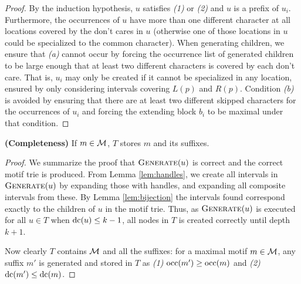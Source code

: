 \begin{proof}
    By the induction hypothesis, $u$ satisfies \emph{(1)} or \emph{(2)} and $u$ is a prefix of $u_i$. Furthermore, the occurrences of $u$ have more than one different character at all locations covered by the don't cares in $u$ (otherwise one of those locations in $u$ could be specialized to the common character).     
    When generating children, we ensure that \emph{(a)} cannot occur by forcing the occurrence list of generated children to be large enough that at least two different characters is covered by each don't care. That is, $u_i$ may only be created if it cannot be specialized in any location, ensured by only considering intervals covering $L(p)$ and $R(p)$. Condition \emph{(b)} is avoided by ensuring that there are at least two different skipped characters for the occurrences of $u_i$ and forcing the extending block $b_i$ to be maximal under that condition. 
\end{proof}

\begin{lemma}\label{lem:completeness}
\textbf{(Completeness)} If $m \in \mathcal{M}$, $T$ stores $m$ and its suffixes.
\end{lemma}
\begin{proof}
    We summarize the proof that $\operatorname{\textsc{Generate}}(u)$ is correct and the correct motif trie is produced. From Lemma \ref{lem:handles}, we create all intervals in $\operatorname{\textsc{Generate}}(u)$ by expanding those with handles, and expanding all composite intervals from these. By Lemma \ref{lem:bijection} the intervals found correspond exactly to the children of $u$ in the motif trie. Thus, as $\operatorname{\textsc{Generate}}(u)$ is executed for all $u \in T$ when $\operatorname{dc}(u) \leq k-1$, all nodes in $T$ is created correctly until depth $k+1$. 
    
    Now clearly $T$ contains $\mathcal{M}$ and all the suffixes: for a maximal motif $m \in \mathcal{M}$, any suffix $m'$ is generated and stored in $T$ as \emph{(1)} $\operatorname{occ}(m') \geq \operatorname{occ}(m)$ and \emph{(2)} $\operatorname{dc}(m') \leq \operatorname{dc}(m)$. 
\end{proof}




